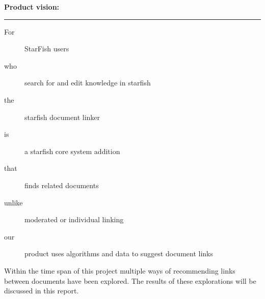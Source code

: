 \begin{shaded}
\textbf{{\large Product vision:}} \vspace{0.4\baselineskip} \hrule
	\begin{description}
 		\item[For] StarFish users
 		\item[who] search for and edit knowledge in starfish
 		\item[the] starfish document linker 
 		\item[is] a starfish core system addition
 		\item[that] finds related documents
 		\item[unlike] moderated or individual linking
 		\item[our] product uses algorithms and data to suggest document links 
	\end{description}
\end{shaded}


Within the time span of this project multiple ways of recommending links between documents have been explored. The results of these explorations will be discussed in this report. 